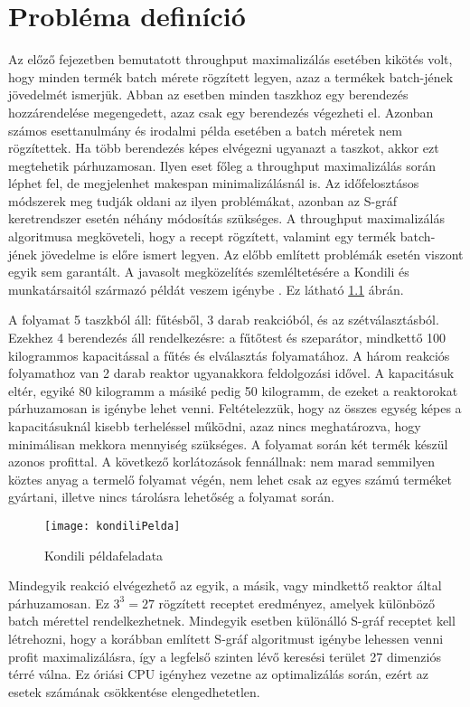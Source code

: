 \chapter{Probléma definíció}
Az előző fejezetben bemutatott throughput maximalizálás esetében kikötés volt, hogy minden termék batch mérete rögzített legyen, azaz a termékek batch-jének jövedelmét ismerjük. Abban az esetben minden taszkhoz egy berendezés hozzárendelése megengedett, azaz csak egy berendezés végezheti el. Azonban számos esettanulmány és irodalmi példa esetében a batch méretek nem rögzítettek. Ha több berendezés képes elvégezni ugyanazt a taszkot, akkor ezt megtehetik párhuzamosan. Ilyen eset főleg a throughput maximalizálás során léphet fel, de megjelenhet makespan minimalizálásnál is. Az időfelosztásos módszerek meg tudják oldani az ilyen problémákat, azonban az S-gráf keretrendszer esetén néhány módosítás szükséges. A throughput maximalizálás algoritmusa megköveteli, hogy a recept rögzített, valamint egy termék batch-jének jövedelme is előre ismert legyen. Az előbb említett problémák esetén viszont egyik sem garantált. 
A javasolt megközelítés szemléltetésére a Kondili és munkatársaitól származó példát veszem igénybe \cite{kondili}. Ez látható \ref{kondiliPelda} ábrán.

A folyamat 5 taszkból áll: fűtésből, 3 darab reakcióból, és az szétválasztásból. Ezekhez 4 berendezés áll rendelkezésre: a fűtőtest és szeparátor, mindkettő 100 kilogrammos kapacitással a fűtés és elválasztás folyamatához. A három reakciós folyamathoz van 2 darab reaktor ugyanakkora feldolgozási idővel. A kapacitásuk eltér, egyiké 80 kilogramm a másiké pedig 50 kilogramm, de ezeket a reaktorokat párhuzamosan is igénybe lehet venni. Feltételezzük, hogy az összes egység képes a kapacitásuknál kisebb terheléssel működni, azaz nincs meghatározva, hogy minimálisan mekkora mennyiség szükséges. A folyamat során két termék készül azonos profittal. A következő korlátozások fennállnak: nem marad semmilyen köztes anyag a termelő folyamat végén, nem lehet csak az egyes számú terméket gyártani, illetve nincs tárolásra lehetőség a folyamat során.
\begin{figure}[H]
\begin{center}
\texttt{[image: kondiliPelda]}
\caption{Kondili példafeladata}
\label{kondiliPelda}
\end{center}
\end{figure}
Mindegyik reakció elvégezhető az egyik, a másik, vagy mindkettő reaktor által párhuzamosan. Ez $3^3 = 27$ rögzített receptet eredményez, amelyek különböző batch mérettel rendelkezhetnek. Mindegyik esetben különálló S-gráf receptet kell létrehozni, hogy a korábban említett S-gráf algoritmust igénybe lehessen venni profit maximalizálásra, így a legfelső szinten lévő keresési terület 27 dimenziós térré válna. Ez óriási CPU igényhez vezetne az optimalizálás során, ezért az esetek számának csökkentése elengedhetetlen.

